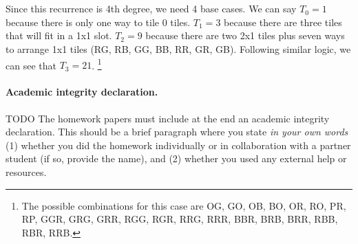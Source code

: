 \documentclass[11pt]{article}
\begin{document}
\begin{solution}
	\\\\ Since this recurrence is 4th degree, we need 4 base cases. We can say $T_0 = 1$ because there is only one way to tile 0 tiles. $T_1 = 3$ because there are three tiles that will fit in a 1x1 slot. $T_2 = 9$ because there are two 2x1 tiles plus seven ways to arrange 1x1 tiles (RG, RB, GG, BB, RR, GR, GB). Following similar logic, we can see that $T_3 = 21$. \footnote[1]{The possible combinations for this case are OG, GO, OB, BO, OR, RO, PR, RP, GGR, GRG, GRR, RGG, RGR, RRG, RRR, BBR, BRB, BRR, RBB, RBR, RRB.}
\end{solution}

\newpage
\vskip 0.1in

\paragraph{Academic integrity declaration.}
TODO
The homework papers must include at the end an academic integrity declaration. This should be a brief paragraph where you state
\emph{in your own words}  (1) whether you did the homework individually or in collaboration with a partner student (if so, provide the name), 
and (2) whether you used any external help or resources. 
\end{document}
